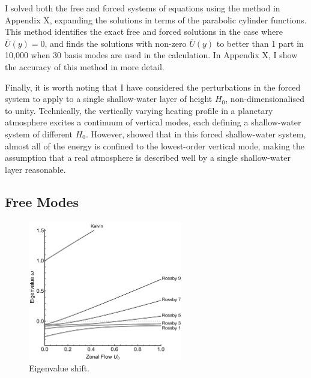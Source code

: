 I solved both the free and forced systems of equations using the method in Appendix X, expanding the solutions in terms of the parabolic cylinder functions. This method identifies the exact free and forced solutions in the case where $\overline{U}(y)=0$, and finds the solutions with non-zero $\overline{U}(y)$ to better than 1 part in 10,000 when 30 basis modes are used in the calculation. In Appendix X, I show the accuracy of this method in more detail.

Finally, it is worth noting that I have considered the perturbations in the forced system to apply to a single shallow-water layer of height $H_{0}$, non-dimensionalised to unity. Technically, the vertically varying heating profile in a planetary atmosphere excites a continuum of vertical modes, each defining a shallow-water system of different $H_{0}$. However, \citet{tsai2014three} showed that in this forced shallow-water system, almost all of the energy is confined to the lowest-order vertical mode, making the assumption that a real atmosphere is described well by a single shallow-water layer reasonable.




\subsection{Free Modes}

\begin{figure}
  \centering
  \includegraphics[width=0.6\textwidth]{figures/wave-mean-flow/shear-flow-eval-shift.pdf}
  \caption{Eigenvalue shift.}
  \label{fig:shear-flow-eval-shift}
\end{figure}


